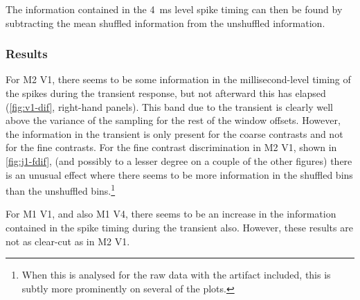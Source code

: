 The information contained in the \SI{4}{ms} level spike timing can then be found by subtracting the mean shuffled information from the unshuffled information.


\subsubsection{Results}

For \ac{M2} \ac{V1}, there seems to be some information in the millisecond-level timing of the spikes during the transient response, but not afterward this has elapsed (\autoref{fig:v1-dif}, right-hand panels).
This band due to the transient is clearly well above the variance of the sampling for the rest of the window offsets.
However, the information in the transient is only present for the coarse contrasts and not for the fine contrasts.
For the fine contrast discrimination in \ac{M2} \ac{V1}, shown in \autoref{fig:j1-fdif}, (and possibly to a lesser degree on a couple of the other figures) there is an unusual effect where there seems to be more information in the shuffled bins than the unshuffled bins.\footnote{When this is analysed for the raw data with the artifact included, this is subtly more prominently on several of the plots.}

For \ac{M1} \ac{V1}, and also \ac{M1} \ac{V4}, there seems to be an increase in the information contained in the spike timing during the transient also.
However, these results are not as clear-cut as in \ac{M2} \ac{V1}.

% 

